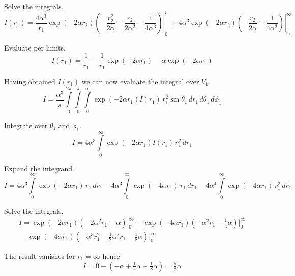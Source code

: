 Solve the integrals.
\begin{equation*}
I(r_1)=
\frac{4\alpha^3}{r_1}
\left.
\exp(-2\alpha r_2)\left(-\frac{r_2^2}{2\alpha}-\frac{r_2}{2\alpha^2}-\frac{1}{4\alpha^3}
\right)\right|_0^{r_1}
+4\alpha^3\left.\exp(-2\alpha r_2)\left(-\frac{r_2}{2\alpha}-\frac{1}{4\alpha^2}\right)\right|_{r_1}^\infty
\end{equation*}

Evaluate per limits.
\begin{equation*}
I(r_1)=\frac{1}{r_1}-\frac{1}{r_1}\exp(-2\alpha r_1)-\alpha\exp(-2\alpha r_1)
\tag{6}
\end{equation*}

Having obtained $I(r_1)$ we can now evaluate the integral over $V_1$.
\begin{equation*}
I=\frac{\alpha^3}{\pi}\int\limits_0^{2\pi}\int\limits_0^\pi\int\limits_0^\infty
\exp(-2\alpha r_1)I(r_1)\,r_1^2\sin\theta_1\,dr_1\,d\theta_1\,d\phi_1
\end{equation*}

Integrate over $\theta_1$ and $\phi_1$.
\begin{equation*}
I=4\alpha^3\int\limits_0^\infty
\exp(-2\alpha r_1)I(r_1)\,r_1^2\,dr_1
\end{equation*}

Expand the integrand.
\begin{equation*}
I=4\alpha^3\int\limits_0^\infty\exp(-2\alpha r_1)\,r_1\,dr_1
-4\alpha^3\int\limits_0^\infty\exp(-4\alpha r_1)\,r_1\,dr_1
-4\alpha^4\int\limits_0^\infty\exp(-4\alpha r_1)\,r_1^2\,dr_1
\end{equation*}

Solve the integrals.
\begin{multline*}
I=\exp(-2\alpha r_1)\left(-2\alpha^2r_1-\alpha\right)\bigg|_0^\infty
-\exp(-4\alpha r_1)\left(-\alpha^2r_1-\tfrac{1}{4}\alpha\right)\bigg|_0^\infty
\\
{}-\exp(-4\alpha r_1)\left(-\alpha^3r_1^2-\tfrac{1}{2}\alpha^2r_1-\tfrac{1}{8}\alpha\right)\bigg|_0^\infty
\end{multline*}

The result vanishes for $r_1=\infty$ hence
\begin{equation*}
I=0-\left(-\alpha+\tfrac{1}{4}\alpha+\tfrac{1}{8}\alpha\right)=\tfrac{5}{8}\alpha
\tag{7}
\end{equation*}


